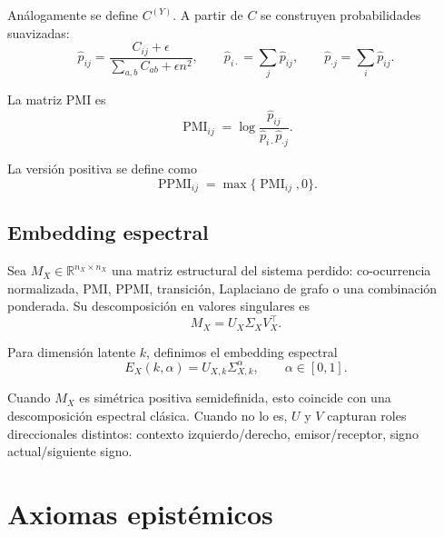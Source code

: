 \documentclass[11pt,a4paper]{article}
\newcommand{\R}{\mathbb{R}}
\newcommand{\1}{\mathbf{1}}
\numberwithin{equation}{section}
\begin{document}
Análogamente se define \(C^{(Y)}\). A partir de \(C\) se construyen probabilidades suavizadas:
\begin{equation}
    \widehat{p}_{ij}
    =
    \frac{C_{ij}+\epsilon}
    {\sum_{a,b} C_{ab}+\epsilon n^2},
    \qquad
    \widehat{p}_{i\cdot}
    =
    \sum_j \widehat{p}_{ij},
    \qquad
    \widehat{p}_{\cdot j}
    =
    \sum_i \widehat{p}_{ij}.
\end{equation}

La matriz PMI es
\begin{equation}
    \operatorname{PMI}_{ij}
    =
    \log
    \frac{\widehat{p}_{ij}}
    {\widehat{p}_{i\cdot}\widehat{p}_{\cdot j}}.
    \label{eq:pmi}
\end{equation}

La versión positiva se define como
\begin{equation}
    \operatorname{PPMI}_{ij}
    =
    \max\{\operatorname{PMI}_{ij},0\}.
\end{equation}

\subsection{Embedding espectral}

Sea \(M_X\in\R^{n_X\times n_X}\) una matriz estructural del sistema perdido: co-ocurrencia normalizada, PMI, PPMI, transición, Laplaciano de grafo o una combinación ponderada. Su descomposición en valores singulares es
\begin{equation}
    M_X = U_X \Sigma_X V_X^\top.
\end{equation}

Para dimensión latente \(k\), definimos el embedding espectral
\begin{equation}
    E_X(k,\alpha)
    =
    U_{X,k}\Sigma_{X,k}^{\alpha},
    \qquad \alpha\in[0,1].
    \label{eq:spectral_embedding}
\end{equation}

Cuando \(M_X\) es simétrica positiva semidefinida, esto coincide con una descomposición espectral clásica. Cuando no lo es, \(U\) y \(V\) capturan roles direccionales distintos: contexto izquierdo/derecho, emisor/receptor, signo actual/siguiente signo.

\section{Axiomas epistémicos}
\end{document}
